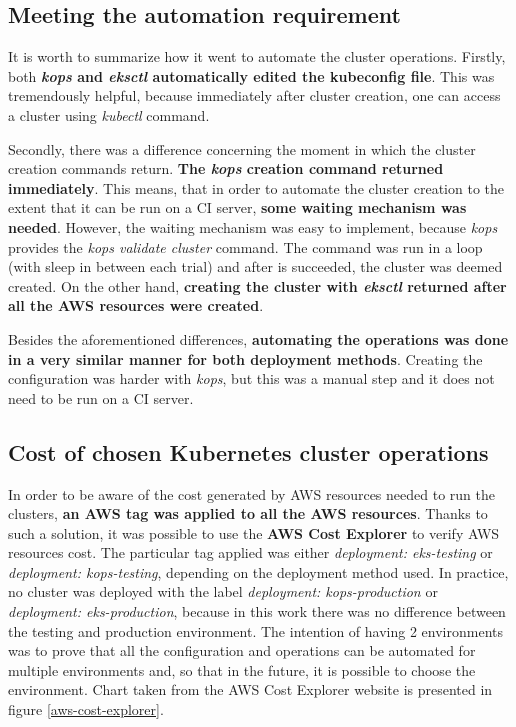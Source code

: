 \subsection{Meeting the automation requirement}

It is worth to summarize how it went to automate the cluster operations. Firstly, both \textbf{\textit{kops} and \textit{eksctl} automatically edited the kubeconfig file}. This was tremendously helpful, because immediately after cluster creation, one can access a cluster using \textit{kubectl} command.

Secondly, there was a difference concerning the moment in which the cluster creation commands return. \textbf{The \textit{kops} creation command returned immediately}. This means, that in order to automate the cluster creation to the extent that it can be run on a CI server, \textbf{some waiting mechanism was needed}. However, the waiting mechanism was easy to implement, because \textit{kops} provides the \textit{kops validate cluster} command. The command was run in a loop (with sleep in between each trial) and after is succeeded, the cluster was deemed created. On the other hand, \textbf{creating the cluster with \textit{eksctl} returned after all the AWS resources were created}.

Besides the aforementioned differences, \textbf{automating the operations was done in a very similar manner for both deployment methods}. Creating the configuration was harder with \textit{kops}, but this was a manual step and it does not need to be run on a CI server.

\subsection{Cost of chosen Kubernetes cluster operations}
In order to be aware of the cost generated by AWS resources needed to run the clusters, \textbf{an AWS tag was applied to all the AWS resources}. Thanks to such a solution, it was possible to use the \textbf{AWS Cost Explorer} to verify AWS resources cost. The particular tag applied was either \textit{deployment: eks-testing} or \textit{deployment: kops-testing}, depending on the deployment method used. In practice, no cluster was deployed with the label \textit{deployment: kops-production} or \textit{deployment: eks-production}, because in this work there was no difference between the testing and production environment. The intention of having 2 environments was to prove that all the configuration and operations can be automated for multiple environments and, so that in the future, it is possible to choose the environment. Chart taken from the AWS Cost Explorer website is presented in figure \ref{aws-cost-explorer}.

